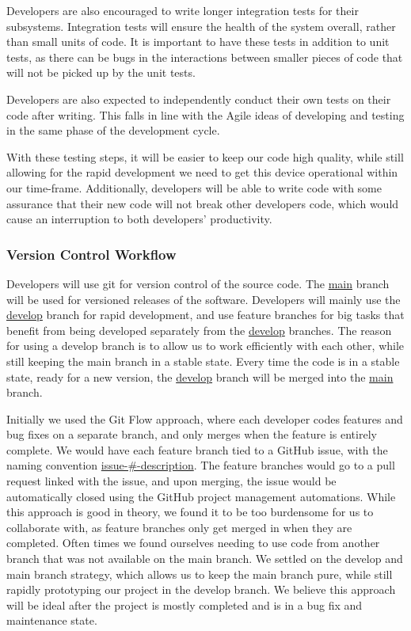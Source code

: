 Developers are also encouraged to write longer integration tests for their subsystems.
Integration tests will ensure the health of the system overall, rather than small units of
code. It is important to have these tests in addition to unit tests, as there can be bugs
in the interactions between smaller pieces of code that will not be picked up by the unit
tests.

Developers are also expected to independently conduct their own tests on their code after
writing. This falls in line with the Agile ideas of developing and testing in the same
phase of the development cycle.

With these testing steps, it will be easier to keep our code high quality, while still
allowing for the rapid development we need to get this device operational within our
time-frame. Additionally, developers will be able to write code with some assurance that
their new code will not break other developers code, which would cause an interruption to
both developers' productivity.

\subsubsection{Version Control Workflow}

Developers will use git for version control of the source code. The \url{main} branch
will be used for versioned releases of the software. Developers will mainly use the
\url{develop} branch for rapid development, and use feature branches for big tasks that
benefit from being developed separately from the \url{develop} branches. The reason for
using a develop branch is to allow us to work efficiently with each other, while still
keeping the main branch in a stable state. Every time the code is in a stable state, ready
for a new version, the \url{develop} branch will be merged into the \url{main} branch.

Initially we used the Git Flow approach, where each developer codes features and bug fixes
on a separate branch, and only merges when the feature is entirely complete. We would have
each feature branch tied to a GitHub issue, with the naming convention
\url{issue-\#-description}. The feature branches would go to a pull request linked with
the issue, and upon merging, the issue would be automatically closed using the GitHub
project management automations. While this approach is good in theory, we found it to be
too burdensome for us to collaborate with, as feature branches only get merged in when
they are completed. Often times we found ourselves needing to use code from another branch
that was not available on the main branch. We settled on the develop and main branch
strategy, which allows us to keep the main branch pure, while still rapidly prototyping
our project in the develop branch. We believe this approach will be ideal after the
project is mostly completed and is in a bug fix and maintenance state.

